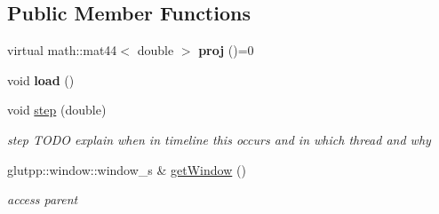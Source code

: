 \subsection*{\-Public \-Member \-Functions}
\begin{DoxyCompactItemize}
\item 
\hypertarget{classglutpp_1_1Camera_1_1Projection_1_1Base_a9d32d33143126264cf78f5522f5b7cde}{virtual math\-::mat44$<$ double $>$ {\bfseries proj} ()=0}\label{classglutpp_1_1Camera_1_1Projection_1_1Base_a9d32d33143126264cf78f5522f5b7cde}

\item 
\hypertarget{classglutpp_1_1Camera_1_1Projection_1_1Base_a4d348ea3fc3134598b02d373a8d081d5}{void {\bfseries load} ()}\label{classglutpp_1_1Camera_1_1Projection_1_1Base_a4d348ea3fc3134598b02d373a8d081d5}

\item 
\hypertarget{classglutpp_1_1Camera_1_1Projection_1_1Base_ac42d1a82122668c3958c586eea0d88d3}{void \hyperlink{classglutpp_1_1Camera_1_1Projection_1_1Base_ac42d1a82122668c3958c586eea0d88d3}{step} (double)}\label{classglutpp_1_1Camera_1_1Projection_1_1Base_ac42d1a82122668c3958c586eea0d88d3}

\begin{DoxyCompactList}\small\item\em step \-T\-O\-D\-O explain when in timeline this occurs and in which thread and why \end{DoxyCompactList}\end{DoxyCompactItemize}
{\bf }\par
\begin{DoxyCompactItemize}
\item 
\hypertarget{classglutpp_1_1Camera_1_1Projection_1_1Base_a48be27bb0adf9017c29c6bd58e535f10}{glutpp\-::window\-::window\-\_\-s \& \hyperlink{classglutpp_1_1Camera_1_1Projection_1_1Base_a48be27bb0adf9017c29c6bd58e535f10}{get\-Window} ()}\label{classglutpp_1_1Camera_1_1Projection_1_1Base_a48be27bb0adf9017c29c6bd58e535f10}

\begin{DoxyCompactList}\small\item\em access parent \end{DoxyCompactList}\end{DoxyCompactItemize}

